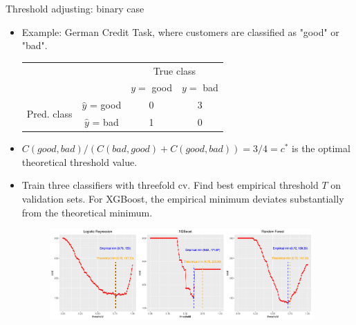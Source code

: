 \documentclass[11pt,compress,t,notes=noshow, xcolor=table]{beamer}
\begin{document}
\begin{vbframe}{Threshold adjusting: binary case}
    \footnotesize 
    \begin{itemize}
        \scriptsize
        \item Example: German Credit Task, where customers are classified as "good" or "bad".
        \begin{center}
                            \begin{tabular}{cc|cc}
        			& &\multicolumn{2}{c}{True class} \\
        			& & $y=$ good & $y=$ bad  \\
        			\hline
        			\multirow{2}{*}{\parbox{0.3cm}{Pred.  class}} & $\hat y$ = good & 0 & 3 \\
        			& $\hat y$ = bad & 1 & 0\\
                \end{tabular}
        \end{center}
        \item $C(good,bad)/(C(bad,good)+C(good,bad))=3/4=c^{*}$ is the optimal theoretical threshold value.

        \item Train three classifiers with threefold cv. Find best empirical threshold $T$ on validation sets. For XGBoost, the empirical minimum deviates substantially from the theoretical minimum.

                \begin{figure}[h]
            \centering
            \includegraphics[width=0.95\textwidth]{slides/imbalanced-learning/figure_man/Cost_Curves_plot.png}
        \end{figure}

    \end{itemize}
\end{vbframe}
\end{document}
